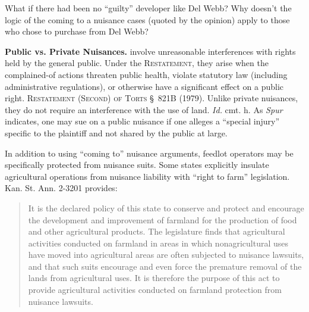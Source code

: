 
\item What if there had been no ``guilty'' developer like Del Webb? Why doesn't
the logic of the coming to a nuisance cases (quoted by the opinion) apply to
those who chose to purchase from Del Webb?

\item \textbf{Public vs. Private Nuisances.}  involve
unreasonable interferences with rights held by the general public. Under the
\textsc{Restatement}, they arise when the complained-of actions threaten public
health, violate statutory law (including administrative regulations), or
otherwise have a significant effect on a public right. \textsc{Restatement
(Second) of Torts} \S~821B (1979). Unlike private nuisances, they do not require
an interference with the use of land. \textit{Id.} cmt. h. As \textit{Spur}
indicates, one may sue on a public nuisance if one alleges a ``special injury''
specific to the plaintiff and not shared by the public at large.

\item In addition to using ``coming to'' nuisance arguments, feedlot operators
may be specifically protected from nuisance suits. Some states explicitly
insulate agricultural operations from nuisance liability with ``right to farm''
legislation. Kan. St. Ann. 2-3201 provides:
\begin{quote}
It is the declared policy of this state to conserve and protect and encourage
the development and improvement of farmland for the production of food and other
agricultural products. The legislature finds that agricultural activities
conducted on farmland in areas in which nonagricultural uses have moved into
agricultural areas are often subjected to nuisance lawsuits, and that such suits
encourage and even force the premature removal of the lands from agricultural
uses. It is therefore the purpose of this act to provide agricultural activities
conducted on farmland protection from nuisance lawsuits.
\end{quote}

